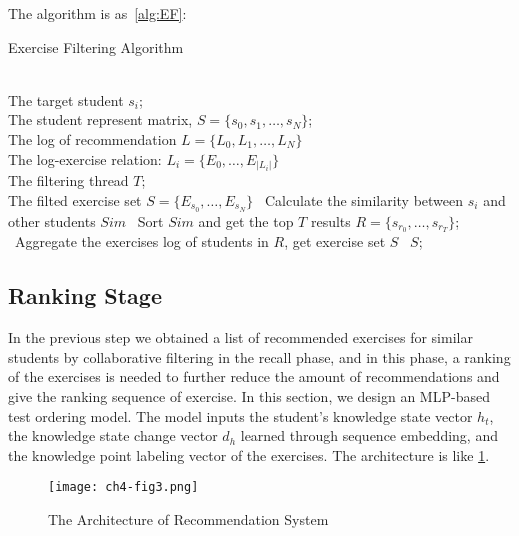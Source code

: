 The algorithm is as~\ref{alg:EF}:
\begin{algorithm}[h]
  \caption{Exercise Filtering Algorithm}\label{alg:EF}
  \begin{algorithmic}
    \REQUIRE~~\\
    The target student \(s_i\); \\
    The student represent matrix, \(S=\{s_0,s_1,\ldots,s_N\} \);\\
    The log of recommendation \(L=\{L_0,L_1,\ldots,L_N\} \) \\
    The log-exercise relation: \(L_i=\{E_0,\ldots,E_{|L_i|}\} \) \\
    The filtering thread \(T\);
    \ENSURE~~\\ %
    The filted exercise set \(S=\{E_{s_0},\ldots,E_{s_N}\} \)
    \STATE~Calculate the similarity between \(s_i\) and other students \(Sim\)
    \STATE~Sort \(Sim\) and get the top \(T\) results \(R=\{s_{r_0},\ldots,s_{r_T}\} \);
    \STATE~Aggregate the exercises log of students in \(R\), get exercise set \(S\)
    \RETURN~\(S\); %
  \end{algorithmic}
\end{algorithm}




\subsection{Ranking Stage}

In the previous step we obtained a list of recommended exercises for similar students by collaborative filtering in the recall phase, and in this phase, a ranking of the exercises is needed to further reduce the amount of recommendations and give the ranking sequence of exercise. In this section, we design an MLP-based test ordering model. The model inputs the student's knowledge state vector \(h_t\), the knowledge state change vector \(d_h\) learned through sequence embedding, and the knowledge point labeling vector of the exercises. The architecture is like \figurename{\ref{fig:ch4-fig3}}.


\begin{figure}[h]
  \centering
  \texttt{[image: ch4-fig3.png]}
  \caption{The Architecture of Recommendation System}\label{fig:ch4-fig3}
\end{figure}

